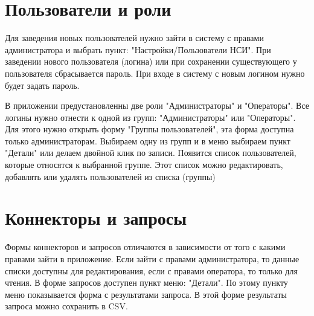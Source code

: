 \documentclass[12pt, a4paper]{article}
\begin{document}
\section{Пользователи и роли}
Для заведения новых пользователей нужно зайти в систему с правами администратора и выбрать пункт: "Настройки/Пользователи НСИ".
При заведении нового пользователя (логина) или при сохранении существующего у пользователя сбрасывается пароль. 
При входе в систему с новым логином нужно будет задать пароль.

В приложении предустановленны две роли "Администраторы" и "Операторы". 
Все логины нужно отнести к одной из групп: "Администраторы" или "Операторы". 
Для этого нужно открыть форму "Группы пользователей", эта форма доступна только администраторам. 
Выбираем одну из групп и в меню выбираем пункт "Детали" или делаем двойной клик по записи. 
Появится список пользователей, которые относятся к выбранной группе. 
Этот список можно редактировать, добавлять или удалять пользователей из списка (группы)



\section{Коннекторы и запросы} 
Формы коннекторов и запросов отличаются в зависимости от того с какими правами зайти в приложение. 
Если зайти с правами администратора, то данные списки доступны для редактирования, если с правами оператора, 
то только для чтения. В форме запросов доступен пункт меню: "Детали". По этому пункту меню показывается форма 
с результатами запроса. В этой форме результаты запроса можно сохранить в CSV.
\end{document}
